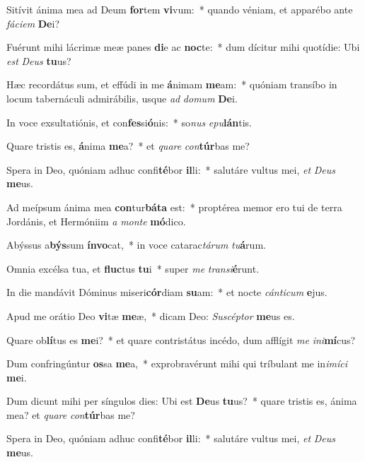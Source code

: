 \item Sitívit ánima mea ad Deum \textbf{for}tem \textbf{vi}vum:~* quando véniam, et apparébo ante \textit{fá}\textit{ci}\textit{em} \textbf{De}i?
\item Fuérunt mihi lácrimæ meæ panes \textbf{di}e ac \textbf{noc}te:~* dum dícitur mihi quotídie: Ubi \textit{est} \textit{De}\textit{us} \textbf{tu}us?
\item Hæc recordátus sum, et effúdi in me \textbf{á}nimam \textbf{me}am:~* quóniam transíbo in locum tabernáculi admirábilis, usque \textit{ad} \textit{do}\textit{mum} \textbf{De}i.
\item In voce exsultatiónis, et con\textbf{fes}si\textbf{ó}nis:~* so\textit{nus} \textit{e}\textit{pu}\textbf{lán}tis.
\item Quare tristis es, \textbf{á}nima \textbf{me}a?~* et \textit{qua}\textit{re} \textit{con}\textbf{túr}bas me?
\item Spera in Deo, quóniam adhuc confi\textbf{té}bor \textbf{il}li:~* salutáre vultus mei, \textit{et} \textit{De}\textit{us} \textbf{me}us.
\item Ad meípsum ánima mea \textbf{con}tur\textbf{bá}\textbf{ta} est:~* proptérea memor ero tui de terra Jordánis, et Hermóniim \textit{a} \textit{mon}\textit{te} \textbf{mó}dico.
\item Abýssus a\textbf{býs}sum \textbf{ín}\textbf{vo}cat,~* in voce catarac\textit{tá}\textit{rum} \textit{tu}\textbf{á}rum.
\item Omnia excélsa tua, et \textbf{fluc}tus \textbf{tu}i~* super \textit{me} \textit{trans}\textit{i}\textbf{é}runt.
\item In die mandávit Dóminus miseri\textbf{cór}diam \textbf{su}am:~* et nocte \textit{cán}\textit{ti}\textit{cum} \textbf{e}jus.
\item Apud me orátio Deo \textbf{vi}tæ \textbf{me}æ,~* dicam Deo: \textit{Su}\textit{scép}\textit{tor} \textbf{me}us es.
\item Quare ob\textbf{lí}tus es \textbf{me}i?~* et quare contristátus incédo, dum afflígit \textit{me} \textit{in}\textit{i}\textbf{mí}cus?
\item Dum confringúntur \textbf{os}sa \textbf{me}a,~* exprobravérunt mihi qui tríbulant me in\textit{i}\textit{mí}\textit{ci} \textbf{me}i.
\item Dum dicunt mihi per síngulos dies: Ubi est \textbf{De}us \textbf{tu}us?~* quare tristis es, ánima mea? et \textit{qua}\textit{re} \textit{con}\textbf{túr}bas me?
\item Spera in Deo, quóniam adhuc confi\textbf{té}bor \textbf{il}li:~* salutáre vultus mei, \textit{et} \textit{De}\textit{us} \textbf{me}us.
